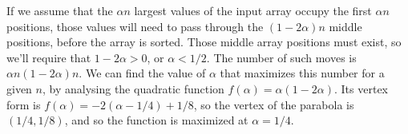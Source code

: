 If we assume that the $\alpha n$ largest values of the input array occupy the first $\alpha n$ positions, those values will need to pass through the $(1-2\alpha)n$ middle positions, before the array is sorted.
Those middle array positions must exist, so we'll require that $1-2\alpha>0$, or $\alpha<1/2$.
The number of such moves is $\alpha n(1-2\alpha)n$.
We can find the value of $\alpha$ that maximizes this number for a given $n$, by analysing the quadratic function $f(\alpha)=\alpha(1-2\alpha)$.
Its vertex form is $f(\alpha)=-2(\alpha-1/4)+1/8$, so the vertex of the parabola is $(1/4,1/8)$, and so the function is maximized at $\alpha=1/4$.
